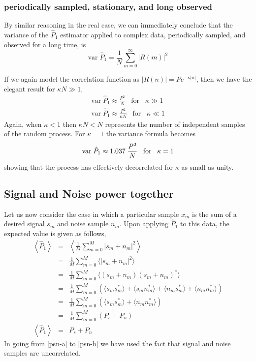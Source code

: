 \subsubsection{periodically sampled, stationary, and long observed}

By similar reasoning in the real case, we can immediately conclude
that the variance of the $\hat{P}_1$ estimator applied to complex
data, periodically sampled, and observed for a long time, is
\begin{equation}
\textrm{var}\;\hat{P}_1 = \frac{1}{N} \sum_{m=0}^{\infty} |R(m)|^2
\end{equation}

If we again model the correlation function as $|R(n)| = Pe^{-\kappa|n|}$,
then we have the elegant result for $\kappa N \gg 1$,
\begin{eqnarray}
\textrm{var}\;\hat{P}_1 \approx \frac{P^2}{N} \;\;\; \textrm{for} \;\;\; \kappa \gg 1 \\[1em]
\textrm{var}\;\hat{P}_1 \approx \frac{P^2}{\kappa N} \;\;\; \textrm{for} \;\;\; \kappa \ll 1
\end{eqnarray}
Again, when $\kappa < 1$ then $\kappa N < N$ represents the number of independent samples of the random process.  For $\kappa = 1$ the variance
formula becomes
\begin{equation}
\textrm{var}\;\hat{P}_1 \approx 1.037 \;\frac{P^2}{N} \;\;\; \textrm{for} \;\;\; \kappa = 1 \\[1em]
\end{equation}
showing that the process has effectively decorrelated for $\kappa$ as small as unity.


\subsection{Signal and Noise power together}

Let us now consider the case in which a particular sample $x_m$ is
the sum of a desired signal $s_m$ and noise sample $n_m$.  Upon
applying $\hat{P}_1$ to this data, the expected value is given as
follows,
\begin{eqnarray}
\left\langle \hat{P}_1 \right\rangle &=& 
\left\langle \frac{1}{M} \sum_{m=0}^M |s_m + n_m|^2 \right\rangle \\
&=& \frac{1}{M} \sum_{m=0}^M \langle |s_m + n_m|^2 \rangle \\
&=& \frac{1}{M} \sum_{m=0}^M \langle (s_m + n_m)(s_m + n_m)^\ast \rangle \\
&=& \frac{1}{M} \sum_{m=0}^M \left( 
   \langle s_m s_m^\ast \rangle + 
   \langle s_m n_m^\ast \rangle + 
   \langle n_m s_m^\ast \rangle + 
   \langle n_m n_m^\ast \rangle \right) \label{e:psn-a} \\
&=& \frac{1}{M} \sum_{m=0}^M \left( 
   \langle s_m s_m^\ast \rangle + \langle n_m n_m^\ast \rangle
 \right) \label{e:psn-b} \\
&=& \frac{1}{M} \sum_{m=0}^M \left( P_s + P_n \right) \\
\left\langle \hat{P}_1 \right\rangle &=& P_s + P_n
\end{eqnarray}
In going from \eqref{psn-a} to \eqref{psn-b} we have used the fact
that signal and noise samples are uncorrelated.


